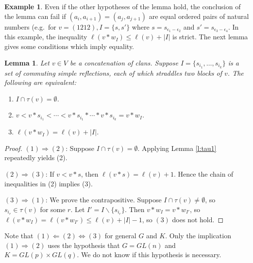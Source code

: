 \documentclass[11pt,letterpaper,reqno]{amsart}
\numberwithin{equation}{section}
\theoremstyle{plain}
\newtheorem{lemma}[theorem]{Lemma}
\theoremstyle{definition}
\newtheorem{example}[theorem]{Example}
\theoremstyle{remark}
\begin{document}
\begin{example}
Even if the other hypotheses of the lemma hold,  the conclusion of the lemma can fail
 if $(a_i, a_{i+1}) = (a_j, a_{j+1})$ are 
equal ordered pairs of natural numbers 
 (e.g.~for $v = (1212),  I = \{ s, s' \}$ where $s = s_{\epsilon_1 - \epsilon_2}$ and $s' = s_{\epsilon_3 - \epsilon_4}$.
In this example, the inequality $\ell(v*w_I) \leq \ell(v) + |I|$ is strict.  The next
lemma gives some conditions which imply equality.
\end{example}

\begin{lemma} \label{l:tau2} Let $v \in V$ be a concatenation of clans.  Suppose $I = \{ s_{i_1}, \ldots, s_{i_k} \}$ is a set
of commuting simple reflections, each of which straddles two blocks of $v$.  The following are equivalent:
\begin{enumerate}
\item $I \cap \tau(v) = \emptyset$.
\item $v < v*s_{i_1} < \cdots < v*s_{i_1}* \cdots * v* s_{i_k} = v* w_I$.
\item $\ell(v* w_I) = \ell(v) + |I|$.
\end{enumerate}
\end{lemma}

\begin{proof}
$(1) \Rightarrow (2)$: Suppose $I \cap \tau(v) = \emptyset$.  Applying Lemma \ref{l:tau1} repeatedly yields (2).

$(2) \Rightarrow (3)$: If $v < v*s$, then $\ell(v*s) = \ell(v) + 1$.  Hence the chain of inequalities in (2) implies (3).

$(3) \Rightarrow (1)$: We prove the contrapositive.  Suppose $I \cap \tau(v) \neq \emptyset$, so  $s_{i_r} \in \tau(v)$ for some $r$.
Let $I' = I \smallsetminus \{ s_{i_r} \}$.  Then $v* w_I = v*w_{I'}$, so $\ell(v* w_I) = \ell(v*w_{I'}) \leq \ell(v) + |I| - 1$, so $(3)$ does not hold.
\end{proof}

Note that $(1) \Leftarrow (2) \Leftrightarrow (3)$ for general $G$ and $K$.  Only the implication $(1) \Rightarrow (2)$ uses the hypothesis that
$G = GL(n)$ and $K = GL(p) \times GL(q)$.  We do not know if this hypothesis is necessary.
\end{document}
